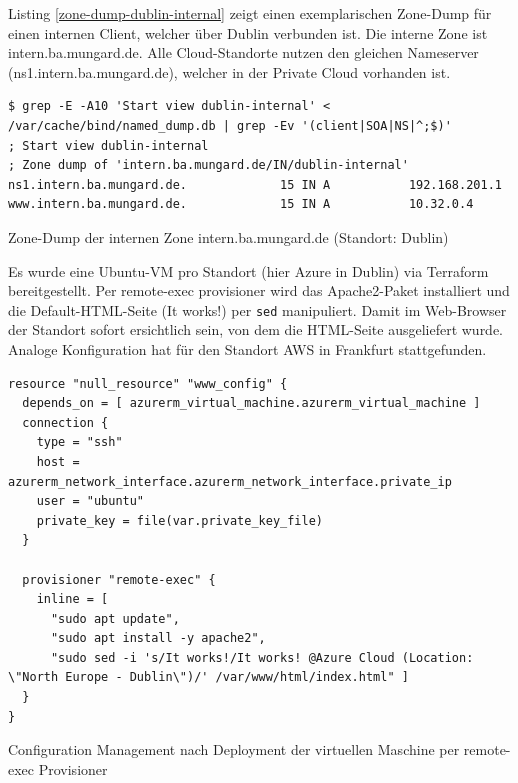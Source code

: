 Listing \ref{zone-dump-dublin-internal} zeigt einen exemplarischen \gls{Zone}-Dump für einen internen \gls{Client}, welcher über Dublin verbunden ist. Die interne \gls{Zone} ist intern.ba.mungard.de. Alle Cloud-Standorte nutzen den gleichen Nameserver (ns1.intern.ba.mungard.de), welcher in der Private Cloud vorhanden ist.\\
\begin{listing}[h]
\begin{verbatim}
$ grep -E -A10 'Start view dublin-internal' < /var/cache/bind/named_dump.db | grep -Ev '(client|SOA|NS|^;$)'
; Start view dublin-internal
; Zone dump of 'intern.ba.mungard.de/IN/dublin-internal'
ns1.intern.ba.mungard.de.             15 IN A           192.168.201.1
www.intern.ba.mungard.de.             15 IN A           10.32.0.4
\end{verbatim}
\caption{Zone-Dump der internen Zone intern.ba.mungard.de (Standort: Dublin)}
\label{zone-dump-dublin-internal}
\end{listing}\FloatBarrier
Es wurde eine Ubuntu-\gls{VM} pro Standort (hier Azure in Dublin) via Terraform bereitgestellt. Per remote-exec provisioner wird das Apache2-Paket installiert und die Default-HTML-Seite (\glqq It works!\grqq{}) per \texttt{sed} manipuliert. Damit im Web-Browser der Standort sofort ersichtlich sein, von dem die HTML-Seite ausgeliefert wurde. Analoge Konfiguration hat für den Standort AWS in Frankfurt stattgefunden.
\begin{listing}[h]
\begin{verbatim}
resource "null_resource" "www_config" {
  depends_on = [ azurerm_virtual_machine.azurerm_virtual_machine ]
  connection {
    type = "ssh"
    host = azurerm_network_interface.azurerm_network_interface.private_ip
    user = "ubuntu"
    private_key = file(var.private_key_file)
  }

  provisioner "remote-exec" {
    inline = [
      "sudo apt update",
      "sudo apt install -y apache2",
      "sudo sed -i 's/It works!/It works! @Azure Cloud (Location: \"North Europe - Dublin\")/' /var/www/html/index.html" ]
  }
}
\end{verbatim}
\caption{Configuration Management nach Deployment der virtuellen Maschine per remote-exec Provisioner}
\label{sed-replace-apache-location}
\end{listing}\FloatBarrier

